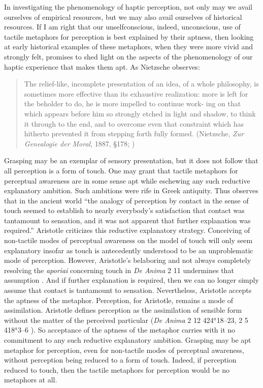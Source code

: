 In investigating the phenomenology of haptic perception, not only may we avail ourselves of empirical resources, but we may also avail ourselves of historical resources. If I am right that our unselfconscious, indeed, unconscious, use of tactile metaphors for perception is best explained by their aptness, then looking at early historical examples of these metaphors, when they were more vivid and strongly felt, promises to shed light on the aspects of the phenomenology of our haptic experience that makes them apt. As Nietzsche observes:
\begin{quote}
	The relief-like, incomplete presentation of an idea, of a whole philosophy, is sometimes more effective than its exhaustive realization: more is left for the beholder to do, he is more impelled to continue work- ing on that which appears before him so strongly etched in light and shadow, to think it through to the end, and to overcome even that constraint which has hitherto prevented it from stepping forth fully formed. (Nietzsche, \emph{Zur Genealogie der Moral}, 1887, §178; \citealt{Smith:1996af})
\end{quote}

Grasping may be an exemplar of sensory presentation, but it does not follow that all perception is a form of touch. One may grant that tactile metaphors for perceptual awareness are in some sense apt while eschewing any such reductive explanatory ambition. Such ambitions were rife in Greek antiquity. Thus \citet[39]{Lindberg:1977aa} observes that in the ancient world ``the analogy of perception by contact in the sense of touch seemed to establish to nearly everybody’s satisfaction that contact was tantamount to sensation, and it was not apparent that further explanation was required.'' Aristotle criticizes this reductive explanatory strategy. Conceiving of non-tactile modes of perceptual awareness on the model of touch will only seem explanatory insofar as touch is antecedently understood to be an unproblematic mode of perception. However, Aristotle's belaboring and not always completely resolving the \emph{aporiai} concerning touch in \emph{De Anima} 2 11 undermines that assumption \citep{Derrida:2005aa,Kalderon:2015fr}. And if further explanation is required, then we can no longer simply assume that contact is tantamount to sensation. Nevertheless, Aristotle accepts the aptness of the metaphor. Perception, for Aristotle, remains a mode of assimilation. Aristotle defines perception as the assimilation of sensible form without the matter of the perceived particular (\emph{De Anima} 2 12 424\( ^{a} \)18–23, 2 5 418\( ^{a} \)3–6 ). So acceptance of the aptness of the metaphor carries with it no commitment to any such reductive explanatory ambition. Grasping may be apt metaphor for perception, even for non-tactile modes of perceptual awareness, without perception being reduced to a form of touch. Indeed, if perception reduced to touch, then the tactile metaphors for perception would be no metaphors at all.

